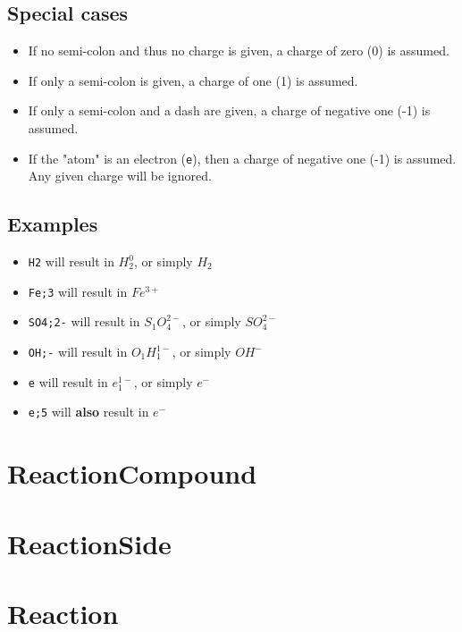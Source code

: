 \documentclass[11pt]{article}
\def\code#1{\texttt{#1}}
\begin{document}
\subsection{Special cases}
\begin{itemize}
  \item{If no semi-colon and thus no charge is given, a charge of zero (0) is assumed.}
  \item{If only a semi-colon is given, a charge of one (1) is assumed.}
  \item{If only a semi-colon and a dash are given, a charge of negative one (-1) is assumed.}
  \item{If the "atom" is an electron (\code{e}), then a charge of negative one (-1) is assumed. Any given charge will be ignored.}
\end{itemize}

\subsection{Examples}
\begin{itemize}
  \item{\code{H2} will result in $H_2^0$, or simply $H_2$}
  \item{\code{Fe;3} will result in $Fe^{3+}$}
  \item{\code{SO4;2-} will result in $S_1O_4^{2-}$, or simply $SO_4^{2-}$}
  \item{\code{OH;-} will result in $O_1H_1^{1-}$, or simply $OH^{-}$}
  \item{\code{e} will result in $e_1^{1-}$, or simply $e^-$}
  \item{\code{e;5} will \textbf{also} result in $e^-$}
\end{itemize}

\section{ReactionCompound}

\section{ReactionSide}

\section{Reaction}
\end{document}
